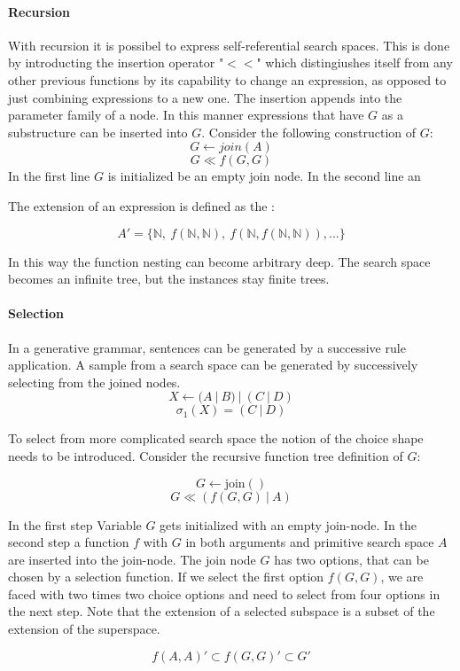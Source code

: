\documentclass[english]{article}
\begin{document}
\paragraph{Recursion}
With recursion it is possibel to express self-referential search spaces. This is done by introducting the insertion operator "$<<$" which distingiushes itself from any other previous functions by its capability to change an expression, as opposed to just combining expressions to a new one. The insertion appends into the parameter family of a node. In this manner expressions that have $G$ as a substructure can be inserted into $G$. Consider the following construction of $G$:
$$G \leftarrow join(A)$$
$$ G  \ll f(G, G)$$
In the first line $G$ is initialized be an empty join node. In the second line an

The extension of an expression is defined as the  :

$$ A' = \{\mathbb{N},\ f(\mathbb{N}, \mathbb{N}),\ f(\mathbb{N}, f(\mathbb{N}, \mathbb{N})), ... \}$$

In this way the function nesting can become arbitrary deep. The search space becomes an infinite tree, but the instances stay finite trees.

\paragraph{Selection}
In a generative grammar, sentences can be generated by a successive rule application. A sample from a search space can be generated by successively selecting from the joined nodes.
$$X \leftarrow (A\ |\ B)\ |\ (C\ |\ D)$$
$$\sigma_1(X) = (C\ |\ D)$$

To select from more complicated search space the notion of the choice shape needs to be introduced. Consider the recursive function tree definition of $G$:

$$ G \leftarrow \operatorname{join()}$$
$$ G \ll (f(G,G)\ |\ A)$$

In the first step Variable $G$ gets initialized with an empty join-node. In the second step a function $f$ with $G$ in both arguments and primitive search space $A$ are inserted into the join-node. The join node $G$ has two options, that can be chosen by a selection function. If we select the first option $f(G,G)$, we are faced with two times two choice options and need to select from four options in the next step. Note that the extension of a selected subspace is a subset of the extension of the superspace.

$$ f(A,A)' \subset f(G,G)' \subset G' $$
\end{document}
